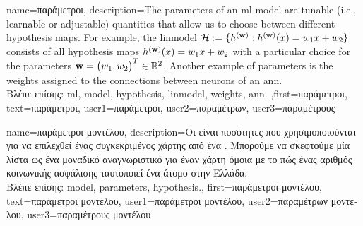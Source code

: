 {name={\foreignlanguage{greek}{παράμετροι}},
	description={The parameters of an \gls{ml} \gls{model} are tunable 
		(i.e., learnable or adjustable) quantities that allow us to choose between different \gls{hypothesis} maps. 
		For example, the \gls{linmodel} $\mathcal{H} := \{h^{({\bf w})}: h^{({\bf w})}(x)= w_{1} x + w_{2}\}$ 
		consists of all \gls{hypothesis} maps $h^{({\bf w})}(x)= w_{1} x + w_{2}$ 
		with a particular choice for the parameters ${\bf w} = \big(w_{1},w_{2}\big)^{T} \in \mathbb{R}^{2}$. 
		Another example of parameters is the \gls{weights} assigned to the connections 
		between neurons of an \gls{ann}.\\
		\foreignlanguage{greek}{Βλέπε επίσης:} \gls{ml}, \gls{model}, \gls{hypothesis}, \gls{linmodel}, \gls{weights}, \gls{ann}.
		},first={\foreignlanguage{greek}{παράμετροι}},
		text={\foreignlanguage{greek}{παράμετροι}},
		user1={\foreignlanguage{greek}{παράμετροι}}, %
		user2={\foreignlanguage{greek}{παραμέτρων}}, %
		user3={\foreignlanguage{greek}{παραμέτρους}} %
}

{name={\foreignlanguage{greek}{παράμετροι μοντέλου}}, 
	description={\foreignlanguage{greek}{Οι}   
		\foreignlanguage{greek}{είναι ποσότητες που χρησιμοποιούνται για να επιλεχθεί ένας συγκεκριμένος χάρτης}  
		 \foreignlanguage{greek}{από ένα} . 
		\foreignlanguage{greek}{Μπορούμε να σκεφτούμε μία λίστα}   
		\foreignlanguage{greek}{ως ένα μοναδικό αναγνωριστικό για έναν χάρτη}  
		\foreignlanguage{greek}{όμοια με το πώς ένας αριθμός κοινωνικής ασφάλισης ταυτοποιεί ένα άτομο στην Ελλάδα.} \\
	\foreignlanguage{greek}{Βλέπε επίσης:} \gls{model}, \gls{parameters}, \gls{hypothesis}.},
	first={\foreignlanguage{greek}{παράμετροι μοντέλου}},
	text={\foreignlanguage{greek}{παράμετροι μοντέλου}},
	user1={\foreignlanguage{greek}{παράμετροι μοντέλου}}, %
	user2={\foreignlanguage{greek}{παραμέτρων μοντέλου}}, %
	user3={\foreignlanguage{greek}{παραμέτρους μοντέλου}} %
}


